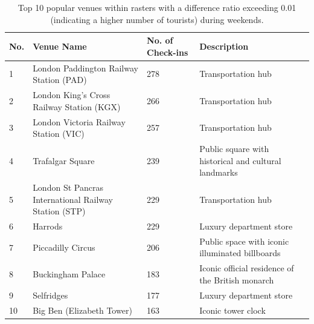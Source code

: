 \documentclass{article}
\theoremstyle{definition}
\theoremstyle{remark}
\begin{document}
\begin{table}[!h]
\centering
\caption{\label{tab:popular_venues_touristspop_weekend}Top 10 popular venues within rasters with a difference ratio exceeding 0.01 (indicating a higher number of tourists) during weekends.}
\begin{adjustbox}{max width=\textwidth, margin=0cm}
\begin{threeparttable}
\begin{tabular}{lp{5cm}lp{4cm}} \hline
No. & Venue Name & No. of Check-ins & Description \\ \hline
1 & London Paddington Railway Station (PAD) & 278 & Transportation hub \\
2 & London King's Cross Railway Station (KGX) & 266 & Transportation hub \\
3 & London Victoria Railway Station (VIC) & 257 & Transportation hub \\
4 & Trafalgar Square & 239 & Public square with historical and cultural landmarks \\
5 & London St Pancras International Railway Station (STP) & 229 & Transportation hub \\
6 & Harrods & 229 & Luxury department store \\
7 & Piccadilly Circus & 206 & Public space with iconic illuminated billboards \\
8 & Buckingham Palace & 183 & Iconic official residence of the British monarch \\
9 & Selfridges & 177 & Luxury department store \\
10 & Big Ben (Elizabeth Tower) & 163 & Iconic tower clock \\ \hline
\end{tabular}
\end{threeparttable}
\end{adjustbox}
\end{table}
\end{document}
